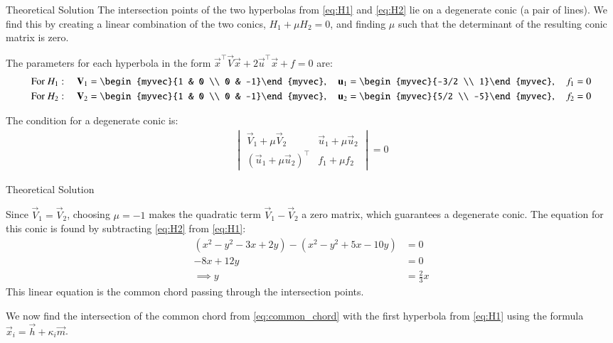 \documentclass{beamer}
\begin{document}
	\begin{frame}{Theoretical Solution}
	 	The intersection points of the two hyperbolas from \eqref{eq:H1} and \eqref{eq:H2} lie on a degenerate conic (a pair of lines). We find this by creating a linear combination of the two conics, $H_1 + \mu H_2 = 0$, and finding $\mu$ such that the determinant of the resulting conic matrix is zero.
	 
	 The parameters for each hyperbola in the form $\vec{x}^\top\vec{V}\vec{x} + 2\vec{u}^\top\vec{x} + f = 0$ are:
	 \begin{align}
	 	\text{For } H_1: \quad \vec{V}_1 = \begin{myvec}{1 & 0 \\ 0 & -1}\end{myvec}, \quad \vec{u}_1 = \begin{myvec}{-3/2 \\ 1}\end{myvec}, \quad f_1 = 0 \\
	 	\text{For } H_2: \quad \vec{V}_2 = \begin{myvec}{1 & 0 \\ 0 & -1}\end{myvec}, \quad \vec{u}_2 = \begin{myvec}{5/2 \\ -5}\end{myvec}, \quad f_2 = 0
	 \end{align}
	 
	 The condition for a degenerate conic is:
	 \begin{align}
	 	\begin{vmatrix} \vec{V}_1 + \mu\vec{V}_2 & \vec{u}_1 + \mu\vec{u}_2 \\ (\vec{u}_1 + \mu\vec{u}_2)^\top & f_1 + \mu f_2 \end{vmatrix} = 0
	 \end{align}
	\end{frame}
		\begin{frame}{Theoretical Solution}
		
Since $\vec{V}_1 = \vec{V}_2$, choosing $\mu = -1$ makes the quadratic term $\vec{V}_1 - \vec{V}_2$ a zero matrix, which guarantees a degenerate conic. The equation for this conic is found by subtracting \eqref{eq:H2} from \eqref{eq:H1}:
\begin{align}
	(x^2 - y^2 - 3x + 2y) - (x^2 - y^2 + 5x - 10y) &= 0 \nonumber \\
	-8x + 12y &= 0 \nonumber \\
	\implies y &= \frac{2}{3}x \label{eq:common_chord}
\end{align}
This linear equation is the common chord passing through the intersection points.


We now find the intersection of the common chord from \eqref{eq:common_chord} with the first hyperbola from \eqref{eq:H1} using the formula $\vec{x}_i = \vec{h} + \kappa_i\vec{m}$.
	\end{frame}
\end{document}
